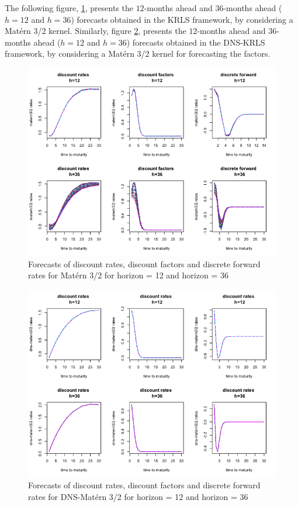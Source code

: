 The following figure, \ref{fcast_matern32}, presents the $12$-months ahead and $36$-months ahead ($h = 12$ and $h = 36$) forecasts obtained in the KRLS framework, by considering a Mat\'ern 3/2 kernel. Similarly, figure \ref{fcast_ns_matern32}, presents the $12$-months ahead and $36$-months ahead ($h = 12$ and $h = 36$) forecasts obtained in the DNS-KRLS framework, by considering a Mat\'ern 3/2 kernel for forecasting the factors. 

\begin{figure}[!htb]
\centering
\includegraphics[width=12.5cm]{gfx/chapter-krls-models/fcast_matern32}
\caption{Forecasts of discount rates, discount factors and discrete forward rates for Mat\'ern 3/2 for horizon = 12 and horizon = 36}
\label{fcast_matern32}
\end{figure}

\begin{figure}[!htb]
\centering
\includegraphics[width=12.5cm]{gfx/chapter-krls-models/fcast_ns_matern32}
\caption{Forecasts of discount rates, discount factors and discrete forward rates for DNS-Mat\'ern 3/2 for horizon = 12 and horizon = 36}
\label{fcast_ns_matern32}
\end{figure}

